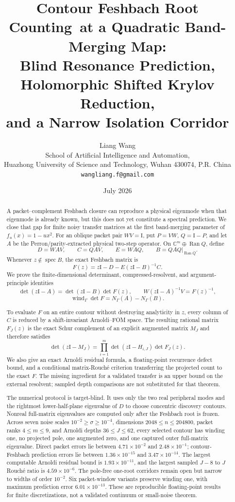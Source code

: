 \documentclass[11pt]{article}
\title{\textbf{Contour Feshbach Root Counting}\
\textbf{at a Quadratic Band-Merging Map:}\\[0.35em]
\large Blind Resonance Prediction, Holomorphic Shifted Krylov Reduction,\\
and a Narrow Isolation Corridor}
\author{Liang Wang\\
\small School of Artificial Intelligence and Automation,\\[-0.2em]
\small Huazhong University of Science and Technology, Wuhan 430074, P.R. China\\
\small \texttt{wangliang.f@gmail.com}}
\date{July 2026}
\theoremstyle{definition}
\theoremstyle{remark}
\newcommand{\C}{\mathbb C}
\newcommand{\Id}{\mathrm I}
\newcommand{\Ran}{\operatorname{Ran}}
\newcommand{\spec}{\operatorname{spec}}
\newcommand{\wind}{\operatorname{wind}}
\begin{document}
\maketitle

\begin{abstract}
A packet--complement Feshbach closure can reproduce a physical eigenmode
when that eigenmode is already known, but this does not yet constitute a
spectral prediction.  We close that gap for finite noisy transfer matrices
at the first band-merging parameter of $f_u(x)=1-u x^2$.  For an oblique
packet pair $WV=\Id$, put $P=VW$, $Q=\Id-P$, and let $A$ be the
Perron/parity-extracted physical two-step operator.  On
$\C^m\oplus\Ran Q$, define
\[
 D=WAV,\qquad C=QAV,\qquad E=WAQ,\qquad
 B=QAQ\big|_{\Ran Q}.
\]
Whenever $z\notin\spec B$, the exact Feshbach matrix is
\[
 F(z)=z\Id-D-E(z\Id-B)^{-1}C.
\]
We prove the finite-dimensional determinant, compressed-resolvent, and
argument-principle identities
\[
 \det(z\Id-A)=\det(z\Id-B)\det F(z),\qquad
 W(z\Id-A)^{-1}V=F(z)^{-1},
\]
\[
 \wind_\Gamma\det F=N_\Gamma(A)-N_\Gamma(B).
\]

To evaluate $F$ on an entire contour without destroying analyticity in
$z$, every column of $C$ is reduced by a shift-invariant Arnoldi--FOM
space.  The resulting rational matrix $F_J(z)$ is the exact Schur
complement of an explicit augmented matrix $M_J$ and therefore satisfies
\[
 \det(z\Id-M_J)
 =\prod_{i=1}^m\det(z\Id-H_{i,J})\det F_J(z).
\]
We also give an exact Arnoldi residual formula, a floating-point recurrence
defect bound, and a conditional matrix-Rouch\'e criterion transferring the
projected count to the exact $F$.  The missing ingredient for a validated
transfer is an upper bound on the external resolvent; sampled depth
comparisons are not substituted for that theorem.

The numerical protocol is target-blind.  It uses only the two real
peripheral modes and the rightmost lower-half-plane eigenvalue of $D$ to
choose concentric discovery contours.  Nonreal full-matrix eigenvalues are
computed only after the Feshbach root is frozen.  Across seven noise scales
$10^{-2}\ge\sigma\ge10^{-4}$, dimensions $2048\le n\le204800$, packet
ranks $4\le m\le9$, and Arnoldi depths $36\le J\le62$, every selected
contour has winding one, no projected pole, one augmented zero, and one
captured outer full-matrix eigenvalue.  Direct packet errors lie between
$4.71\times10^{-2}$ and $2.48\times10^{-1}$; contour-Feshbach prediction
errors lie between $1.36\times10^{-15}$ and $3.47\times10^{-14}$.  The
largest computable Arnoldi residual bound is $1.93\times10^{-11}$, and the
largest sampled $J-8$ to $J$ Rouch\'e ratio is $4.59\times10^{-6}$.  The
pole-free one-root corridors remain open but narrow to widths of order
$10^{-2}$.  Six packet-window variants preserve winding one, with maximum
prediction error $6.01\times10^{-13}$.  These are reproducible
floating-point results for finite discretizations, not a validated
continuum or small-noise theorem.
\end{abstract}
\end{document}
